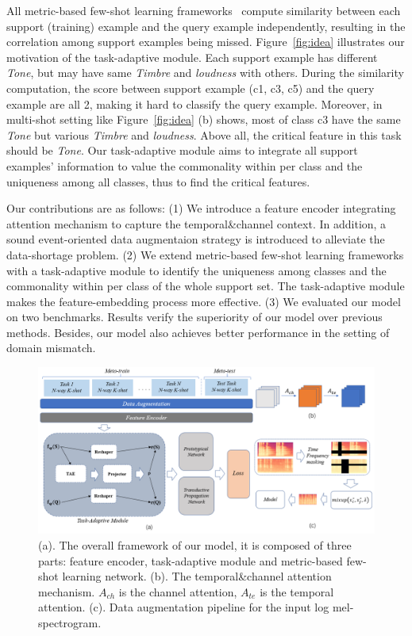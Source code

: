 \documentclass[a4paper]{article}
\begin{document}
All metric-based few-shot learning frameworks~\cite{fewShotGNN, TPN, protoNet, relationNet, CloserLook} compute similarity between each support (training) example and the query example independently, resulting in the correlation among support examples being missed. Figure~\ref{fig:idea} illustrates our motivation of the task-adaptive module. Each support example has different \textit{Tone}, but may have same \textit{Timbre} and \textit{loudness} with others. During the similarity computation, the score between support example (c1, c3, c5) and the query example are all 2, making it hard to classify the query example. Moreover, in multi-shot setting like Figure~\ref{fig:idea} (b) shows, most of class c3 have the same \textit{Tone} but various \textit{Timbre} and \textit{loudness}. Above all, the critical feature in this task should be \textit{Tone}. Our task-adaptive module aims to integrate all support examples' information to value the commonality within per class and the uniqueness among all classes, thus to find the critical features. 

Our contributions are as follows: 
(1) We introduce a feature encoder integrating attention mechanism to capture the temporal\&channel context. In addition, a sound event-oriented data augmentaion strategy is introduced to alleviate the data-shortage problem. 
(2) We extend metric-based few-shot learning frameworks with a task-adaptive module to identify the uniqueness among classes and the commonality within per class of the whole support set. The task-adaptive module makes the feature-embedding process more effective. (3) We evaluated our model on two benchmarks. Results verify the superiority of our model over previous methods. Besides, our model also achieves better performance in the setting of domain mismatch.

\begin{figure}[t]
	\centering
    \vspace*{-12mm}
	\includegraphics[width=\linewidth]{./pic/model.png}
	\vspace*{-6mm}
	\caption{(a). The overall framework of our model, it is composed of three parts: feature encoder, task-adaptive module and metric-based few-shot learning network. (b). The temporal\&channel attention mechanism. $A_{ch}$ is the channel attention, $A_{te}$ is the temporal attention. (c). Data augmentation pipeline for the input log mel-spectrogram.}
	\label{fig:model}
	\vspace*{-3mm}
\end{figure}
\end{document}
